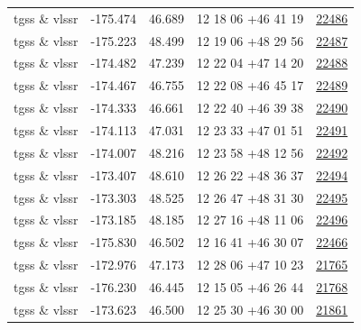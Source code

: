 \documentclass{article}
\begin{document}
\begin{longtable}{c|c|c|c|c}
tgss \& vlssr & -175.474 & 46.689 & 12 18 06 +46 41 19 &  \href{http://banana.transientskp.org/r4/vlo_KmeulenTrap4P23/runningcatalog/22486}{22486} \\
tgss \& vlssr & -175.223 & 48.499 & 12 19 06 +48 29 56 &  \href{http://banana.transientskp.org/r4/vlo_KmeulenTrap4P23/runningcatalog/22487}{22487} \\
tgss \& vlssr & -174.482 & 47.239 & 12 22 04 +47 14 20 &  \href{http://banana.transientskp.org/r4/vlo_KmeulenTrap4P23/runningcatalog/22488}{22488} \\
tgss \& vlssr & -174.467 & 46.755 & 12 22 08 +46 45 17 &  \href{http://banana.transientskp.org/r4/vlo_KmeulenTrap4P23/runningcatalog/22489}{22489} \\
tgss \& vlssr & -174.333 & 46.661 & 12 22 40 +46 39 38 &  \href{http://banana.transientskp.org/r4/vlo_KmeulenTrap4P23/runningcatalog/22490}{22490} \\
tgss \& vlssr & -174.113 & 47.031 & 12 23 33 +47 01 51 &  \href{http://banana.transientskp.org/r4/vlo_KmeulenTrap4P23/runningcatalog/22491}{22491} \\
tgss \& vlssr & -174.007 & 48.216 & 12 23 58 +48 12 56 &  \href{http://banana.transientskp.org/r4/vlo_KmeulenTrap4P23/runningcatalog/22492}{22492} \\
tgss \& vlssr & -173.407 & 48.610 & 12 26 22 +48 36 37 &  \href{http://banana.transientskp.org/r4/vlo_KmeulenTrap4P23/runningcatalog/22494}{22494} \\
tgss \& vlssr & -173.303 & 48.525 & 12 26 47 +48 31 30 &  \href{http://banana.transientskp.org/r4/vlo_KmeulenTrap4P23/runningcatalog/22495}{22495} \\
tgss \& vlssr & -173.185 & 48.185 & 12 27 16 +48 11 06 &  \href{http://banana.transientskp.org/r4/vlo_KmeulenTrap4P23/runningcatalog/22496}{22496} \\
tgss \& vlssr & -175.830 & 46.502 & 12 16 41 +46 30 07 &  \href{http://banana.transientskp.org/r4/vlo_KmeulenTrap4P23/runningcatalog/22466}{22466} \\
tgss \& vlssr & -172.976 & 47.173 & 12 28 06 +47 10 23 &  \href{http://banana.transientskp.org/r4/vlo_KmeulenTrap4P23/runningcatalog/21765}{21765} \\
tgss \& vlssr & -176.230 & 46.445 & 12 15 05 +46 26 44 &  \href{http://banana.transientskp.org/r4/vlo_KmeulenTrap4P23/runningcatalog/21768}{21768} \\
tgss \& vlssr & -173.623 & 46.500 & 12 25 30 +46 30 00 &  \href{http://banana.transientskp.org/r4/vlo_KmeulenTrap4P23/runningcatalog/21861}{21861} \\

\end{longtable}
\end{document}
